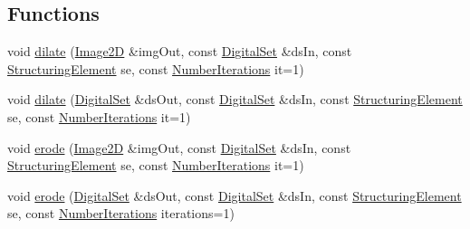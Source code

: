 \subsection*{Functions}
\begin{DoxyCompactItemize}
\item 
void \mbox{\hyperlink{namespaceDIPaCUS_1_1Morphology_a94b7121d637a835ba0982b2578ba142b}{dilate}} (\mbox{\hyperlink{namespaceDIPaCUS_1_1Morphology_a9aff9edf28d681accfc54435fbefcbee}{Image2D}} \&img\+Out, const \mbox{\hyperlink{namespaceDIPaCUS_1_1Morphology_ab69fa725716b0ed4c311c0d00a292be7}{Digital\+Set}} \&ds\+In, const \mbox{\hyperlink{structDIPaCUS_1_1Morphology_1_1StructuringElement}{Structuring\+Element}} se, const \mbox{\hyperlink{namespaceDIPaCUS_1_1Morphology_a8ffa7d1c2023be8b21bc87a4b7df7cca}{Number\+Iterations}} it=1)
\item 
void \mbox{\hyperlink{namespaceDIPaCUS_1_1Morphology_a2748662dcc9ecb081156aaa599a535d8}{dilate}} (\mbox{\hyperlink{namespaceDIPaCUS_1_1Morphology_ab69fa725716b0ed4c311c0d00a292be7}{Digital\+Set}} \&ds\+Out, const \mbox{\hyperlink{namespaceDIPaCUS_1_1Morphology_ab69fa725716b0ed4c311c0d00a292be7}{Digital\+Set}} \&ds\+In, const \mbox{\hyperlink{structDIPaCUS_1_1Morphology_1_1StructuringElement}{Structuring\+Element}} se, const \mbox{\hyperlink{namespaceDIPaCUS_1_1Morphology_a8ffa7d1c2023be8b21bc87a4b7df7cca}{Number\+Iterations}} it=1)
\item 
void \mbox{\hyperlink{namespaceDIPaCUS_1_1Morphology_a3c3fd0423507cf0d21084b434039689e}{erode}} (\mbox{\hyperlink{namespaceDIPaCUS_1_1Morphology_a9aff9edf28d681accfc54435fbefcbee}{Image2D}} \&img\+Out, const \mbox{\hyperlink{namespaceDIPaCUS_1_1Morphology_ab69fa725716b0ed4c311c0d00a292be7}{Digital\+Set}} \&ds\+In, const \mbox{\hyperlink{structDIPaCUS_1_1Morphology_1_1StructuringElement}{Structuring\+Element}} se, const \mbox{\hyperlink{namespaceDIPaCUS_1_1Morphology_a8ffa7d1c2023be8b21bc87a4b7df7cca}{Number\+Iterations}} it=1)
\item 
void \mbox{\hyperlink{namespaceDIPaCUS_1_1Morphology_a592a651d48216270bfd75bcebe63eec7}{erode}} (\mbox{\hyperlink{namespaceDIPaCUS_1_1Morphology_ab69fa725716b0ed4c311c0d00a292be7}{Digital\+Set}} \&ds\+Out, const \mbox{\hyperlink{namespaceDIPaCUS_1_1Morphology_ab69fa725716b0ed4c311c0d00a292be7}{Digital\+Set}} \&ds\+In, const \mbox{\hyperlink{structDIPaCUS_1_1Morphology_1_1StructuringElement}{Structuring\+Element}} se, const \mbox{\hyperlink{namespaceDIPaCUS_1_1Morphology_a8ffa7d1c2023be8b21bc87a4b7df7cca}{Number\+Iterations}} iterations=1)
\item 

\end{DoxyCompactItemize}
